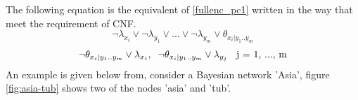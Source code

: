             The following equation is the equivalent of \ref{fullenc_pc1} written in the way that meet the requirement of CNF.
            \begin{equation}\label{fullenc_IP}
                \neg\lambda_{x_{i}} \vee \neg\lambda_{y_{1}} \vee... \vee \neg\lambda_{y_{m}} \vee \theta_{x_{i}|y_{1}..y_{m}}
            \end{equation}
            \begin{equation}\label{fullenc_PI}
                \neg\theta_{x_{i}|y_{1}..y_{m}} \vee \lambda_{x_{i}},\\ \;\;
                \neg\theta_{x_{i}|y_{1}..y_{m}} \vee \lambda_{y_{j}} \;\; \mbox{ j = 1, ..., m}
            \end{equation}
            An example is given below from, consider a Bayesian network 'Asia', figure \ref{fig:asia-tub} shows two of the nodes 'asia' and 'tub'.
            
